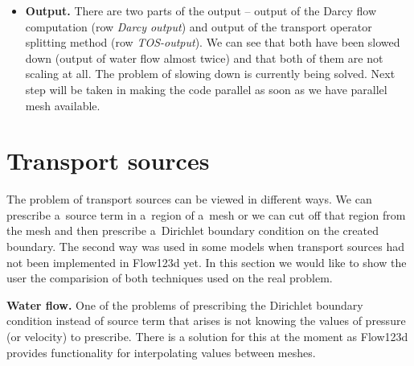 \begin{itemize}
\item \textbf{Output.} There are two parts of the output -- output of the Darcy flow computation (row \emph{Darcy output}) and 
output of the transport operator splitting method (row \emph{TOS-output}). We can see that both have been slowed down 
(output of water flow almost twice) and that both of them are not scaling at all. The problem of
slowing down is currently being solved. Next step will be taken in making the code parallel as soon as we have parallel mesh available.

\end{itemize}

\pagebreak

\clearpage



\clearpage

\section{Transport sources}
The problem of transport sources can be viewed in different ways. We can prescribe a~source term in a~region of a~mesh 
or we can cut off that region from the mesh and then prescribe a~Dirichlet boundary condition on the created boundary. 
The second way was used in some models when transport sources had not been implemented in Flow123d yet.
In this section we would like to show the user the comparision of both techniques used on the real problem.

\textbf{Water flow.} One of the problems of prescribing the Dirichlet boundary condition instead of source term that arises
is not knowing the values of pressure (or velocity) to prescribe. There is a solution for this at the moment as Flow123d provides
functionality for interpolating values between meshes. 

